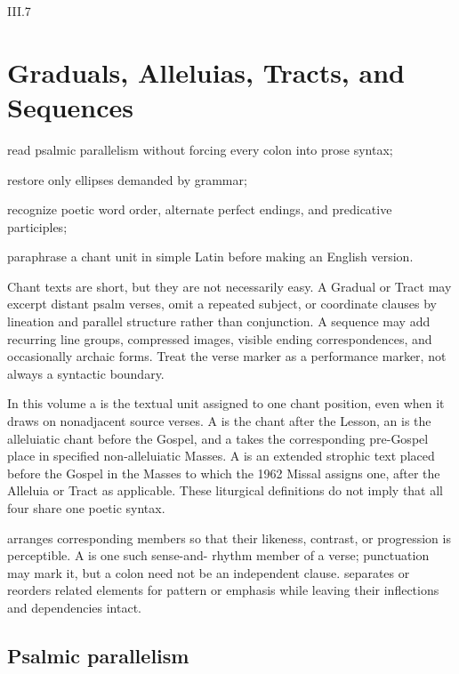 \begin{courseunit}{III.7}
\chapter{Graduals, Alleluias, Tracts, and Sequences}

\begin{learningobjectives}
  \item read psalmic parallelism without forcing every colon into prose syntax;
  \item restore only ellipses demanded by grammar;
  \item recognize poetic word order, alternate perfect endings, and predicative participles;
  \item paraphrase a chant unit in simple Latin before making an English version.
\end{learningobjectives}

Chant texts are short, but they are not necessarily easy. A Gradual or Tract
may excerpt distant psalm verses, omit a repeated subject, or coordinate clauses
by lineation and parallel structure rather than conjunction. A sequence may add
recurring line groups, compressed images, visible ending correspondences, and
occasionally archaic forms. Treat the verse marker as a performance marker,
not always a syntactic boundary.

In this volume a  is the textual unit assigned to one chant
position, even when it draws on nonadjacent source verses. A  is
the chant after the Lesson, an  is the alleluiatic chant before
the Gospel, and a  takes the corresponding pre-Gospel place in
specified non-alleluiatic Masses. A  is an extended strophic
text placed before the Gospel in the Masses to which the 1962 Missal assigns
one, after the Alleluia or Tract as applicable. These liturgical definitions do
not imply that all four share one poetic syntax.

 arranges corresponding members so that their likeness,
contrast, or progression is perceptible. A  is one such sense-and-
rhythm member of a verse; punctuation may mark it, but a colon need not be an
independent clause.  separates or reorders related
elements for pattern or emphasis while leaving their inflections and
dependencies intact.

\section{Psalmic parallelism}


\end{courseunit}
